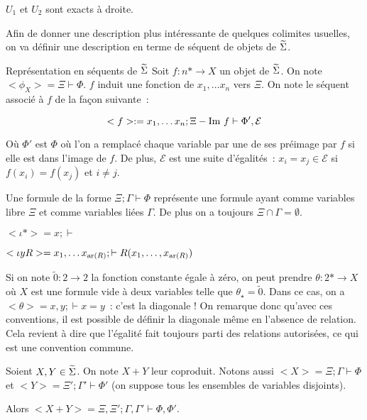 \begin{cor}
    $U_1$ et $U_2$ sont exacts à droite.
\end{cor}

Afin de donner une description plus intéressante de quelques colimites usuelles, on
va définir une description en terme de séquent de objets de $\widetilde{\Sigma}$.

\begin{defi}{Représentation en séquents de $\widetilde{\Sigma}$}
    Soit $f : n\ast\rightarrow X$ un objet de $\widetilde{\Sigma}$. On note
    $<\phi_X> = \Xi\vdash\Phi$. $f$ induit une fonction de $x_1,\dots x_n$ vers $\Xi$.
    On note le séquent associé à $f$ de la façon suivante~:

    \[ <f> := x_1, \dots x_n; \Xi - \text{Im } f\vdash \Phi',\mathcal{E} \]

    Où $\Phi'$ est $\Phi$ où l'on a remplacé chaque variable par une de ses préimage
    par $f$ si elle est dans l'image de $f$. De plus, $\mathcal{E}$ est une suite
    d'égalités~: $x_i=x_j\in\mathcal{E}$ si $f(x_i) = f(x_j)$ et $i\neq j$.

    Une formule de la forme $\Xi;\Gamma\vdash \Phi$ représente une formule ayant comme
    variables libre $\Xi$ et comme variables liées $\Gamma$. De plus on a toujours
    $\Xi\cap\Gamma=\emptyset$.
\end{defi}

\begin{exs}
    \item $<\iota\ast> = x;\vdash$
    \item $<\iota yR> = x_1,\dots x_{\text{ar}(R)};\vdash R(x_1, \dots, x_{\text{ar}(R)})$
    \item Si on note $\tilde{0} : 2\rightarrow 2$ la fonction constante égale à
        zéro, on peut prendre $\theta : 2\ast\rightarrow X$ où $X$ est une formule
        vide à deux variables telle que $\theta_\star = \tilde{0}$. Dans ce cas, on
        a $<\theta> = x,y;\vdash x = y$~: c'est la diagonale ! On remarque donc
        qu'avec ces conventions, il est possible de définir la diagonale même en
        l'absence de relation. Cela revient à dire que l'égalité fait toujours
        parti des relations autorisées, ce qui est une convention commune.
\end{exs}

\begin{lem}
    Soient $X,Y\in\widetilde{\Sigma}$. On note $X+Y$ leur coproduit. Notons aussi
    $<X> = \Xi;\Gamma\vdash\Phi$ et $<Y> = \Xi';\Gamma'\vdash\Phi'$ (on suppose
    tous les ensembles de variables disjoints).
    
    Alors $<X+Y> = \Xi,\Xi';\Gamma,\Gamma'\vdash\Phi,\Phi'$.
\end{lem}

